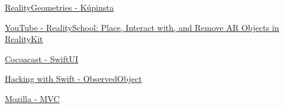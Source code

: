 \documentclass{report}
\begin{document}
\hyperlink{https://github.com/maxxfrazer/RealityGeometries}{RealityGeometries - Kúpinsta}

\hyperlink{https://www.youtube.com/watch?v=itGRaAryUxA}{YouTube - RealitySchool: Place, Interact with, and Remove AR Objects in RealityKit}

\hyperlink{https://cocoacasts.com/swiftui-fundamentals-what-is-swiftui}{Cocoacast - SwiftUI}

\hyperlink{https://www.hackingwithswift.com/quick-start/swiftui/how-to-use-observedobject-to-manage-state-from-external-objects}{Hacking with Swift - ObservedObject}

\hyperlink{https://developer.mozilla.org/en-US/docs/Glossary/MVC}{Mozilla - MVC}
\end{document}
